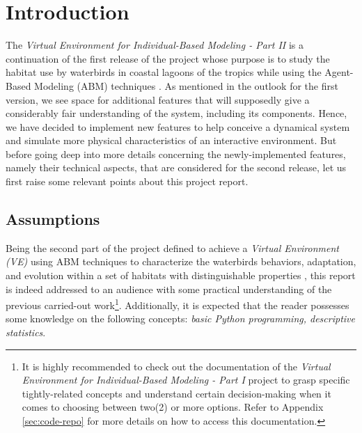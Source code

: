 %
%
%


\section{Introduction}
The \emph{Virtual Environment for Individual-Based Modeling - Part II} is a continuation of the first release of the project whose purpose is to study the habitat use by waterbirds in coastal lagoons of the tropics while using the Agent-Based Modeling (ABM) techniques \cite{rflorent2019veibm1}. As mentioned in the outlook for the first version, we see space for additional features that will supposedly give a considerably fair understanding of the system, including its components. Hence, we have decided to implement new features to help conceive a dynamical system and simulate more physical characteristics of an interactive environment. But before going deep into more details concerning the newly-implemented features, namely their technical aspects, that are considered for the second release, let us first raise some relevant points about this project report.

\subsection{Assumptions}
Being the second part of the project defined to achieve a \emph{Virtual Environment (VE)} using ABM techniques to characterize the waterbirds behaviors, adaptation, and evolution within a set of habitats with distinguishable properties \cite{rflorent2019veibm1}, this report is indeed addressed to an audience with some practical understanding of the previous carried-out work\footnote{It is highly recommended to check out the documentation of the \emph{Virtual Environment for Individual-Based Modeling - Part I} project to grasp specific tightly-related concepts and understand certain decision-making when it comes to choosing between two(2) or more options. Refer to Appendix \ref{sec:code-repo} for more details on how to access this documentation.}. Additionally, it is expected that the reader possesses some knowledge on the following concepts: \emph{basic Python programming, descriptive statistics}.

